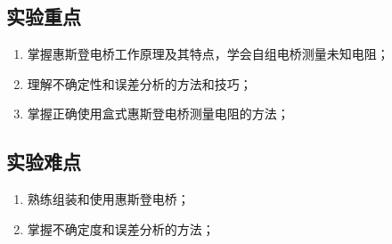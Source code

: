 \documentclass[]{../../templates/Report}%
\begin{document}
\subsection{实验重点}
\begin{enumerate}[label=(\arabic*),leftmargin=3em]
    \item 掌握惠斯登电桥工作原理及其特点，学会自组电桥测量未知电阻；
    \item 理解不确定性和误差分析的方法和技巧；
    \item 掌握正确使用盒式惠斯登电桥测量电阻的方法；
\end{enumerate}
\subsection{实验难点}
\begin{enumerate}[label=(\arabic*),leftmargin=3em]
    \item 熟练组装和使用惠斯登电桥；
    \item 掌握不确定度和误差分析的方法；
\end{enumerate}
\end{document}
